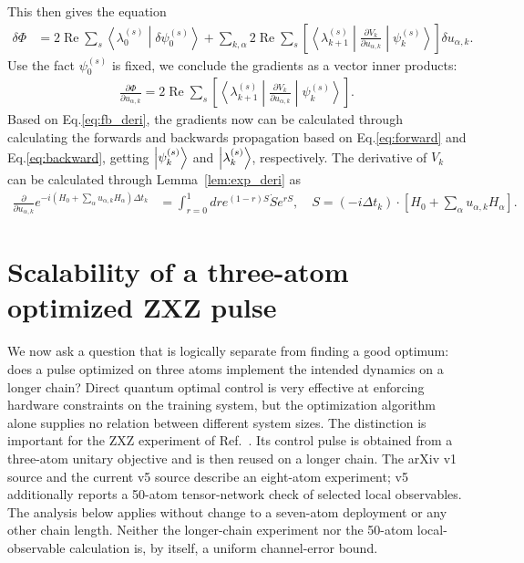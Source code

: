 This then gives the equation
\begin{align}
\delta\Phi&=
    2\operatorname{Re}\sum_s\left\langle\lambda_0^{(s)}\middle|\delta\psi_0^{(s)}\right\rangle+\sum_{k,\alpha}2\operatorname{Re}\sum_s\left[\left\langle\lambda_{k+1}^{(s)}\middle|\frac{\partial V_k}{\partial u_{\alpha, k}}\middle|\psi_k^{(s)}\right\rangle\right]\delta u_{\alpha,k}.
\end{align}
Use the fact $\psi_0^{(s)}$ is fixed, we conclude the gradients as a vector inner products:
\begin{align}\label{eq:fb_deri}
    \frac{\partial \Phi}{\partial u_{\alpha,k}} = 2\operatorname{Re}\sum_s\left[\left\langle\lambda_{k+1}^{(s)}\middle|\frac{\partial V_k}{\partial u_{\alpha, k}}\middle|\psi_k^{(s)}\right\rangle\right].
\end{align}
Based on Eq.\eqref{eq:fb_deri}, the gradients now can be calculated through calculating the forwards and backwards propagation based on Eq.\eqref{eq:forward} and Eq.\eqref{eq:backward}, getting $\ket{\psi_k^{(s)}}$ and $\ket{\lambda_k^{(s)}}$, respectively. 
The derivative of $V_k$ can be calculated through Lemma~\ref{lem:exp_deri} as
\begin{align}
\frac{\partial}{\partial u_{\alpha, k}}  e^{-i(H_0+\sum_\alpha u_{\alpha,k}H_\alpha) \Delta t_k}&= \int_{r = 0}^1 dr e^{(1-r)S} \dot{S} e^{rS},\quad S = (-i\Delta t_k) \cdot \left[H_0 + \sum_{\alpha} u_{\alpha,k} H_{\alpha}\right].
\end{align}

\section{Scalability of a three-atom optimized ZXZ pulse}
\label{sec:zxz-scalability}

We now ask a question that is logically separate from finding a good optimum:
does a pulse optimized on three atoms implement the intended dynamics on a
longer chain?  Direct quantum optimal control is very effective at enforcing
hardware constraints on the training system, but the optimization algorithm
alone supplies no relation between different system sizes.  The distinction is
important for the ZXZ experiment of Ref.~\cite{hu2025universal}.  Its control
pulse is obtained from a three-atom unitary objective and is then reused on a
longer chain.  The arXiv v1 source and the current v5 source describe an
eight-atom experiment; v5 additionally reports a 50-atom tensor-network check
of selected local observables.  The analysis below applies without change to a
seven-atom deployment or any other chain length.  Neither the longer-chain
experiment nor the 50-atom local-observable calculation is, by itself, a
uniform channel-error bound.


